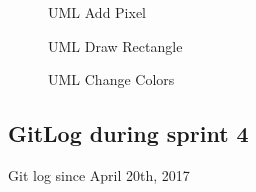 \documentclass[11pt]{article} %
\begin{document}
{\begin{figure}[H]
	\centering
	\caption{UML Add Pixel}
	\label{fig:UML2 }
\end{figure}

\begin{figure}[H]
	\centering
	\caption{UML Draw Rectangle}
	\label{fig:UML2 }
\end{figure}

\begin{figure}[H]
	\centering
	\caption{UML Change Colors}
	\label{fig:UML2 }
\end{figure}



\newpage
\subsection{GitLog during sprint 4}
Git log since April 20th, 2017



}
\end{document}
